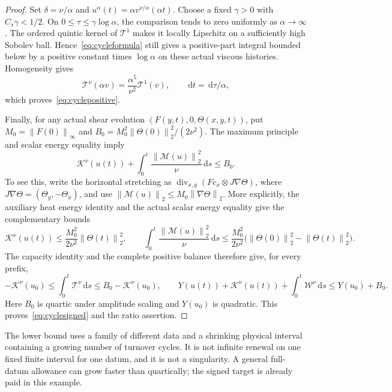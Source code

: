 \documentclass[11pt]{article}
\newcommand{\dd}{\,\mathrm d}
\newcommand{\norm}[1]{\left\lVert#1\right\rVert}
\begin{document}
\begin{proof}
Set $\delta=\nu/\alpha$ and
$u^\alpha(t)=\alpha v^{\nu/\alpha}(\alpha t)$.
Choose a fixed $\gamma>0$ with $C_s\gamma<1/2$.
On $0\leq\tau\leq\gamma\log\alpha$, the comparison tends to zero
uniformly as $\alpha\to\infty$. The ordered quintic kernel of
$\mathcal T^1$ makes it locally Lipschitz on a sufficiently high
Sobolev ball. Hence~\eqref{eq:cycleformula} still gives a positive-part
integral bounded below by a positive constant times $\log\alpha$
on these actual viscous histories. Homogeneity gives
\[
 \mathcal T^\nu(\alpha v)=\frac{\alpha^5}{\nu^2}\mathcal T^1(v),
 \qquad \dd t=\dd\tau/\alpha,
\]
which proves~\eqref{eq:cyclepositive}.

Finally, for any actual shear evolution $(F(y,t),0,\Theta(x,y,t))$,
put $M_0=\norm{F(0)}_\infty$ and
$B_0=M_0^2\norm{\Theta(0)}_2^2/(2\nu^2)$.
The maximum principle and scalar energy equality imply
\[
 \mathcal K^\nu(u(t))+\int_0^t\frac{\norm{\mathcal M(u)}_2^2}{\nu}\dd s
       \leq B_0.
\]
To see this, write the horizontal stretching as
$\operatorname{div}_{x,y}(F e_x\otimes J\nabla\Theta)$, where
$J\nabla\Theta=(\Theta_y,-\Theta_x)$, and use
$\norm{\mathcal M(u)}_2\leq M_0\norm{\nabla\Theta}_2$.
More explicitly, the auxiliary heat energy identity and the actual
scalar energy equality give the complementary bounds
\[
 \mathcal K^\nu(u(t))\leq\frac{M_0^2}{2\nu^2}\norm{\Theta(t)}_2^2,
 \qquad
 \int_0^t\frac{\norm{\mathcal M(u)}_2^2}{\nu}\dd s
 \leq\frac{M_0^2}{2\nu^2}
       \bigl(\norm{\Theta(0)}_2^2-\norm{\Theta(t)}_2^2\bigr).
\]
The capacity identity and the complete positive balance therefore give,
for every prefix,
\[
 -\mathcal K^\nu(u_0)\leq\int_0^t\mathcal T^\nu\dd s
       \leq B_0-\mathcal K^\nu(u_0),\qquad
 Y(u(t))+\mathcal K^\nu(u(t))+\int_0^t\mathcal W^\nu\dd s
       \leq Y(u_0)+B_0.
\]
Here $B_0$ is quartic under amplitude scaling and $Y(u_0)$ is quadratic.
This proves~\eqref{eq:cyclesigned} and the ratio assertion.
\end{proof}

The lower bound uses a family of different data and a shrinking physical
interval containing a growing number of turnover cycles. It is not
infinite renewal on one fixed finite interval for one datum, and it is
not a singularity. A general full-datum allowance can grow faster than
quartically; the signed target is already paid in this example.
\end{document}
